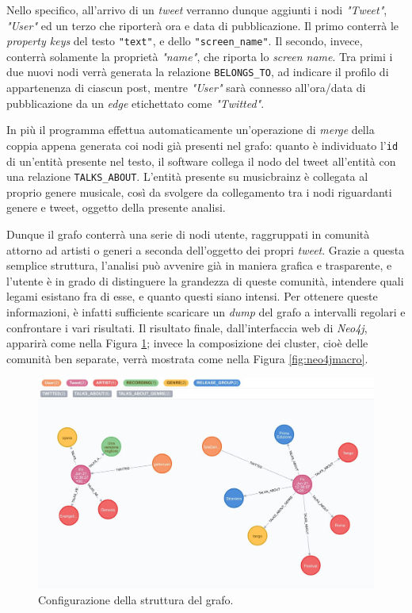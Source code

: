 \documentclass[12pt, a4paper, twocolumn]{article} %
\begin{document}
Nello specifico, all'arrivo di un \textit{tweet} verranno dunque aggiunti i nodi \textit{"Tweet"}, \textit{"User"} ed un terzo che riporterà ora e data di pubblicazione.
Il primo conterrà le \textit{property keys} del testo \verb|"text"|, e dello \verb|"screen_name"|. 
Il secondo, invece, conterrà solamente la proprietà \textit{"name"}, che riporta lo \textit{screen name}. 
Tra primi i due nuovi nodi verrà generata la relazione \verb|BELONGS_TO|, ad indicare il profilo di appartenenza di ciascun post, mentre \textit{"User"} sarà connesso all'ora/data di pubblicazione da un \textit{edge} etichettato come \textit{"Twitted"}.

In più il programma effettua automaticamente un'operazione di \textit{merge} della coppia appena generata coi nodi già presenti nel grafo: quanto è individuato l'\verb|id| di un'entità presente nel testo, il software collega il nodo del tweet all'entità con una relazione \verb|TALKS_ABOUT|.
L'entità presente su musicbrainz è collegata al proprio genere musicale, così da svolgere da collegamento tra i nodi riguardanti genere e tweet, oggetto della presente analisi.

Dunque il grafo conterrà una serie di nodi utente, raggruppati in comunità attorno ad artisti o generi a seconda dell'oggetto dei propri \textit{tweet}.
Grazie a questa semplice struttura, l'analisi può avvenire già in maniera grafica e trasparente, e l'utente è in grado di distinguere la grandezza di queste comunità, intendere quali legami esistano fra di esse, e quanto questi siano intensi.
Per ottenere queste informazioni, è infatti sufficiente scaricare un \textit{dump} del grafo a intervalli regolari e confrontare i vari risultati.
Il risultato finale, dall'interfaccia web di \textit{Neo4j}, apparirà come nella Figura \ref{fig:neo4jmicro}; invece la composizione dei cluster, cioè delle comunità ben separate, verrà mostrata come nella Figura \ref{fig:neo4jmacro}.

\begin{figure}[h!]
  \centering
  \includegraphics[width=0.8\linewidth]{small_graph.png}
  \caption{Configurazione della struttura del grafo.}
  \label{fig:neo4jmicro}
\end{figure}
\end{document}
